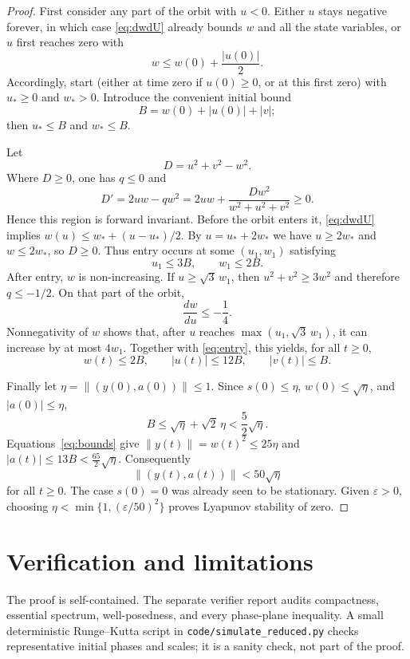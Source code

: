 \documentclass[11pt]{article}
\begin{document}
\begin{proof}
First consider any part of the orbit with $u<0$.  Either $u$ stays negative
forever, in which case \eqref{eq:dwdU} already bounds $w$ and all the state
variables, or $u$ first reaches zero with
\[
 w\le w(0)+\frac{|u(0)|}{2}.
\]
Accordingly, start (either at time zero if $u(0)\ge0$, or at this first
zero) with $u_\ast\ge0$ and $w_\ast>0$.  Introduce the convenient initial
bound
\[
 B=w(0)+|u(0)|+|v|;
\]
then $u_\ast\le B$ and $w_\ast\le B$.

Let
\[
 D=u^2+v^2-w^2.
\]
Where $D\ge0$, one has $q\le0$ and
\[
 D'=2uw-qw^2=2uw+\frac{D w^2}{w^2+u^2+v^2}\ge0.
\]
Hence this region is forward invariant.  Before the orbit enters it,
\eqref{eq:dwdU} implies
$w(u)\le w_\ast+(u-u_\ast)/2$.  By
$u=u_\ast+2w_\ast$ we have $u\ge2w_\ast$ and $w\le2w_\ast$, so $D\ge0$.
Thus entry occurs at some $(u_1,w_1)$ satisfying
\begin{equation}\label{eq:entry}
 u_1\le3B,\qquad w_1\le2B.
\end{equation}
After entry, $w$ is non-increasing.  If
$u\ge\sqrt3\,w_1$, then
$u^2+v^2\ge3w^2$ and therefore $q\le-1/2$.  On that part of the orbit,
\[
 \frac{dw}{du}\le-\frac14.
\]
Nonnegativity of $w$ shows that, after $u$ reaches
$\max(u_1,\sqrt3\,w_1)$, it can increase by at most $4w_1$.  Together with
\eqref{eq:entry}, this yields, for all $t\ge0$,
\begin{equation}\label{eq:bounds}
 w(t)\le2B,\qquad |u(t)|\le12B,\qquad |v(t)|\le B.
\end{equation}

Finally let $\eta=\|(y(0),a(0))\|\le1$.  Since
$s(0)\le\eta$, $w(0)\le\sqrt\eta$, and $|a(0)|\le\eta$,
\[
 B\le\sqrt\eta+\sqrt2\,\eta<\frac52\sqrt\eta.
\]
Equations~\eqref{eq:bounds} give
$\|y(t)\|=w(t)^2\le25\eta$ and
$|a(t)|\le13B<\frac{65}{2}\sqrt\eta$.  Consequently
\[
 \|(y(t),a(t))\|<50\sqrt\eta
\]
for all $t\ge0$.  The case $s(0)=0$ was already seen to be stationary.  Given
$\varepsilon>0$, choosing
$\eta<\min\{1,(\varepsilon/50)^2\}$ proves Lyapunov stability of zero.
\end{proof}

\section{Verification and limitations}

The proof is self-contained.  The separate verifier report audits compactness,
essential spectrum, well-posedness, and every phase-plane inequality.  A small
deterministic Runge--Kutta script in \texttt{code/simulate\_reduced.py}
checks representative initial phases and scales; it is a sanity check, not
part of the proof.
\end{document}
